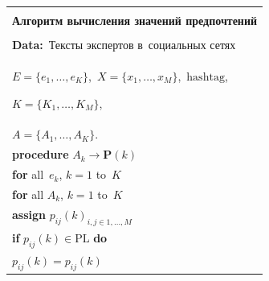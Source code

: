\begin{enumerate}[(1)]
\begin{equation*}
  \end{equation*}


  




  \begin{center}


  {\small


  \begin{tabular}{l}


  \hline


  \\[-9pt]


  \multicolumn{1}{c}{\textbf{Алгоритм вычисления значений предпочтений}}\\[3pt]


  \hline


  \\[-9pt]


\textbf{Data:}\ Тексты экспертов в~социальных сетях\\


  \hspace{2mm}$E=\{e_1, \ldots , e_K\}$,\ $X=\{x_1, \ldots , x_M\}$,\ $\mathrm{hashtag}$, 


$K=\{ K_1, \ldots , K_M\}$,\\


\hspace*{10mm}$A=\{A_1, \ldots , A_K\}$.\\


       \hspace*{4mm}\textbf{procedure} $A_k\to \mathbf{P}(k)$\\


          \hspace*{6mm}\textbf{for} all~$e_k$, $k=1$ to~$K$\\


          \hspace*{8mm}\textbf{for} all $A_k$, $k=1$ to~$K$\\


             \hspace*{10mm}\textbf{assign} $p_{ij}(k)_{i,j\in 1,\ldots , M}$\\


          \hspace*{12mm}\textbf{if} $p_{ij}(k)\in \mathrm{PL}$ \textbf{do}\\


          \hspace*{13mm}$p_{ij}(k)=p_{ij}(k)$\\



\end{tabular}}
\end{center}
\end{enumerate}

